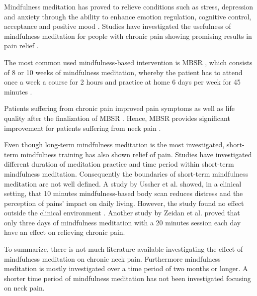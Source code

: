 Mindfulness meditation has proved to relieve conditions such as stress, depression and anxiety through the ability to enhance emotion regulation, cognitive control, acceptance and positive mood \cite{Zeidan2016, Zeidan2012}. Studies have investigated the usefulness of mindfulness meditation for people with chronic pain showing promising results in pain relief \cite{Kabat1982,Rosenzweig2010}.


The most common used mindfulness-based intervention is MBSR \cite{Cramer2012}, which consists of 8 or 10 weeks of mindfulness meditation, whereby the patient has to attend once a week a course for 2 hours and practice at home 6 days per week for 45 minutes \cite{Kabat1982, Chiesa2010}. 


Patients suffering from chronic pain improved pain symptoms as well as life quality after the finalization of MBSR \cite{Zeidan2012}.
%
Hence, MBSR provides significant improvement for patients suffering from neck pain \cite{Rosenzweig2010}.

Even though long-term mindfulness meditation is the most investigated, short-term mindfulness training has also shown relief of pain. Studies have investigated different duration of meditation practice and time period within short-term mindfulness meditation. Consequently the boundaries of short-term mindfulness meditation are not well defined. A study by Ussher et al. \cite{Ussher2012} showed, in a clinical setting, that 10 minutes mindfulness-based body scan reduces distress and the perception of pains’ impact on daily living. However, the study found no effect outside the clinical environment \cite{Ussher2012}. Another study by Zeidan et al. \cite{Zeidan2012} proved that only three days of mindfulness meditation with a 20 minutes session each day have an effect on relieving chronic pain. 

To summarize, there is not much literature available investigating the effect of mindfulness meditation on chronic neck pain. Furthermore mindfulness meditation is mostly investigated over a time period of two months or longer. A shorter time period of mindfulness meditation has not been investigated focusing on neck pain.

